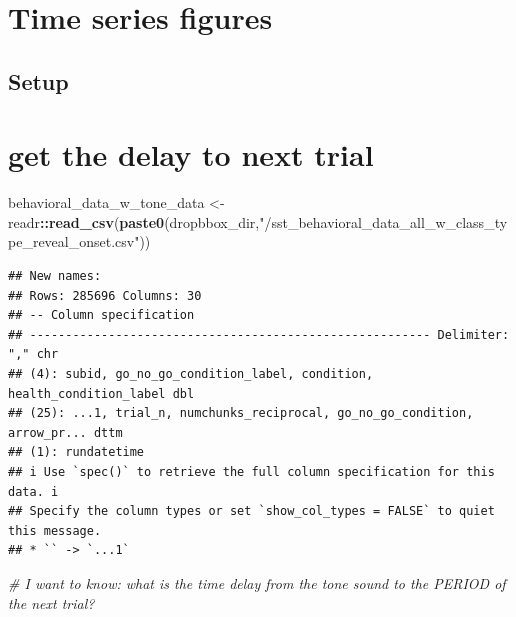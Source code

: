 \documentclass[
]{article}
\newenvironment{Shaded}{\begin{snugshade}}{\end{snugshade}}
\newcommand{\CommentTok}[1]{\textcolor[rgb]{0.56,0.35,0.01}{\textit{#1}}}
\newcommand{\KeywordTok}[1]{\textcolor[rgb]{0.13,0.29,0.53}{\textbf{#1}}}
\newcommand{\NormalTok}[1]{#1}
\newcommand{\OperatorTok}[1]{\textcolor[rgb]{0.81,0.36,0.00}{\textbf{#1}}}
\newcommand{\StringTok}[1]{\textcolor[rgb]{0.31,0.60,0.02}{#1}}
\begin{document}
\hypertarget{time-series-figures}{%
\section{Time series figures}\label{time-series-figures}}

\hypertarget{setup}{%
\subsection{Setup}\label{setup}}

\hypertarget{get-the-delay-to-next-trial}{%
\section{get the delay to next
trial}\label{get-the-delay-to-next-trial}}

\begin{Shaded}
\begin{Highlighting}[]
\NormalTok{behavioral_data_w_tone_data <-}\StringTok{ }\NormalTok{readr}\OperatorTok{::}\KeywordTok{read_csv}\NormalTok{(}\KeywordTok{paste0}\NormalTok{(dropbbox_dir,}\StringTok{"/sst_behavioral_data_all_w_class_type_reveal_onset.csv"}\NormalTok{))}
\end{Highlighting}
\end{Shaded}

\begin{verbatim}
## New names:
## Rows: 285696 Columns: 30
## -- Column specification
## -------------------------------------------------------- Delimiter: "," chr
## (4): subid, go_no_go_condition_label, condition, health_condition_label dbl
## (25): ...1, trial_n, numchunks_reciprocal, go_no_go_condition, arrow_pr... dttm
## (1): rundatetime
## i Use `spec()` to retrieve the full column specification for this data. i
## Specify the column types or set `show_col_types = FALSE` to quiet this message.
## * `` -> `...1`
\end{verbatim}

\begin{Shaded}
\begin{Highlighting}[]
\CommentTok{# I want to know: what is the time delay from the tone sound to the PERIOD of the next trial?}
\end{Highlighting}
\end{Shaded}
\end{document}
